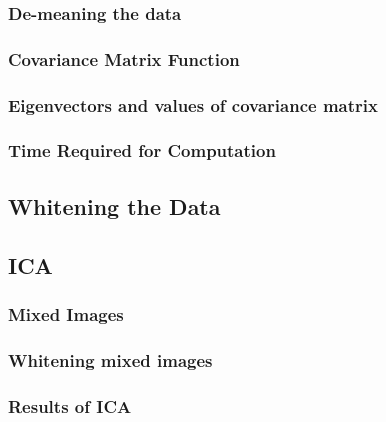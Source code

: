 \documentclass[11pt, oneside]{article}
\begin{document}
\subsubsection{De-meaning the data}

\subsubsection{Covariance Matrix Function}

\subsubsection{Eigenvectors and values of covariance matrix}

\subsubsection{Time Required for Computation}

\subsection{Whitening the Data}

\subsection{ICA}

\subsubsection{Mixed Images}

\subsubsection{Whitening mixed images}

\subsubsection{Results of ICA}
\end{document}

